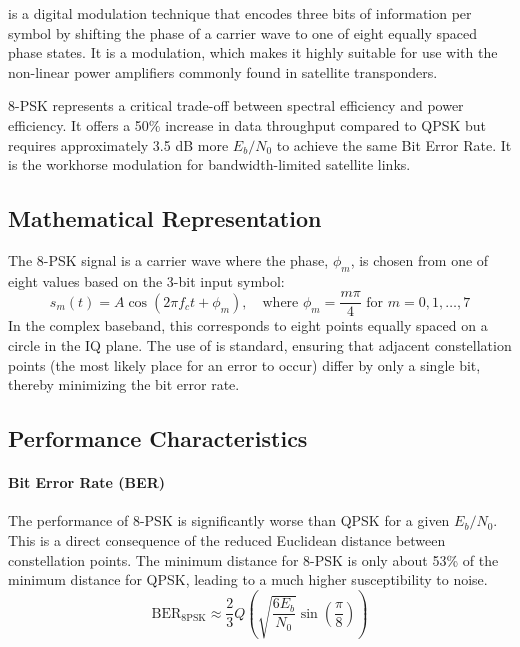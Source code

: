 is a digital modulation technique that encodes three bits of information per symbol by shifting the phase of a carrier wave to one of eight equally spaced phase states. It is a  modulation, which makes it highly suitable for use with the non-linear power amplifiers commonly found in satellite transponders.

\begin{keyconcept}
    8-PSK represents a critical trade-off between spectral efficiency and power efficiency. It offers a 50\% increase in data throughput compared to QPSK but requires approximately 3.5 dB more $E_b/N_0$ to achieve the same Bit Error Rate. It is the workhorse modulation for bandwidth-limited satellite links.
\end{keyconcept}


\subsection{Mathematical Representation}

The 8-PSK signal is a carrier wave where the phase, $\phi_m$, is chosen from one of eight values based on the 3-bit input symbol:
\begin{equation}
    s_m(t) = A\cos(2\pi f_c t + \phi_m), \quad \text{where } \phi_m = \frac{m\pi}{4} \text{ for } m = 0, 1, \dots, 7
\end{equation}
In the complex baseband, this corresponds to eight points equally spaced on a circle in the IQ plane. The use of  is standard, ensuring that adjacent constellation points (the most likely place for an error to occur) differ by only a single bit, thereby minimizing the bit error rate.


\subsection{Performance Characteristics}

\paragraph{Bit Error Rate (BER)}
The performance of 8-PSK is significantly worse than QPSK for a given $E_b/N_0$. This is a direct consequence of the reduced Euclidean distance between constellation points. The minimum distance for 8-PSK is only about 53\% of the minimum distance for QPSK, leading to a much higher susceptibility to noise.
\begin{equation}
    \text{BER}_{8\text{PSK}} \approx \frac{2}{3}Q\left(\sqrt{\frac{6E_b}{N_0}} \sin\left(\frac{\pi}{8}\right)\right)
\end{equation}


